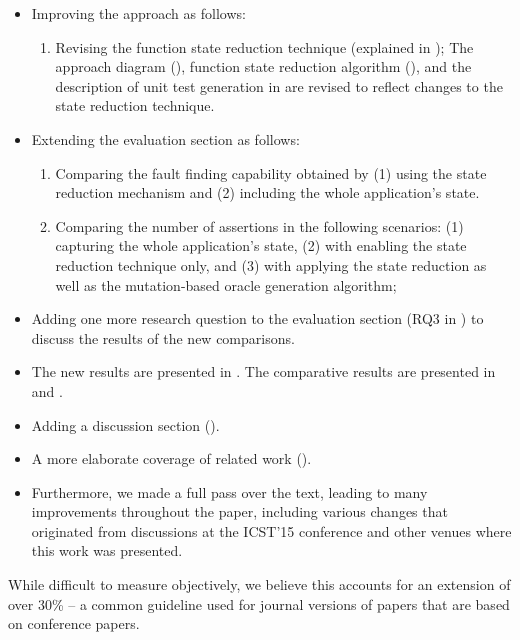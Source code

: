 \begin{itemize}

\item Improving the approach as follows:

\begin{enumerate}
\item Revising the function state reduction technique (explained in ); The approach diagram (), function state reduction algorithm (), and the description of unit test generation in  are revised to reflect changes to the state reduction technique. 
\end{enumerate}

\item Extending the evaluation section as follows:

\begin{enumerate} 
\item Comparing the fault finding capability obtained by (1) using the state reduction mechanism and (2) including the whole application's state.
\item Comparing the number of assertions in the following scenarios:
(1) capturing the whole application's state, (2) with enabling the state reduction technique only, and (3) with applying the state reduction as well as the mutation-based oracle generation algorithm;
\end{enumerate}

\item Adding one more research question to the evaluation section (RQ3 in ) to discuss the results of the new comparisons. 

\item The new results are presented in . The comparative results are presented in  and .
\item Adding a discussion section (). 
\item A more elaborate coverage of related work ().
\item Furthermore, we made a full pass over the text,
   leading to many improvements throughout the paper,
   including various changes that originated from discussions at the
   ICST'15 conference and other venues where this work was presented. 

\end{itemize}

\medskip

While difficult to measure objectively, we believe this accounts for
   an extension of over 30\% -- a common guideline used for journal versions
   of papers that are based on conference papers.
